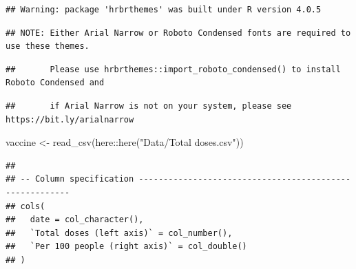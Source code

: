 \documentclass[11pt,a4paper,]{article}
\newenvironment{Shaded}{\begin{snugshade}}{\end{snugshade}}
\newcommand{\FunctionTok}[1]{\textcolor[rgb]{0.00,0.00,0.00}{#1}}
\newcommand{\NormalTok}[1]{#1}
\newcommand{\OtherTok}[1]{\textcolor[rgb]{0.56,0.35,0.01}{#1}}
\newcommand{\SpecialCharTok}[1]{\textcolor[rgb]{0.00,0.00,0.00}{#1}}
\newcommand{\StringTok}[1]{\textcolor[rgb]{0.31,0.60,0.02}{#1}}
\begin{document}
\begin{verbatim}
## Warning: package 'hrbrthemes' was built under R version 4.0.5
\end{verbatim}

\begin{verbatim}
## NOTE: Either Arial Narrow or Roboto Condensed fonts are required to use these themes.
\end{verbatim}

\begin{verbatim}
##       Please use hrbrthemes::import_roboto_condensed() to install Roboto Condensed and
\end{verbatim}

\begin{verbatim}
##       if Arial Narrow is not on your system, please see https://bit.ly/arialnarrow
\end{verbatim}

\begin{Shaded}
\begin{Highlighting}[]
\NormalTok{vaccine }\OtherTok{\textless{}{-}} \FunctionTok{read\_csv}\NormalTok{(here}\SpecialCharTok{::}\FunctionTok{here}\NormalTok{(}\StringTok{"Data/Total doses.csv"}\NormalTok{))}
\end{Highlighting}
\end{Shaded}

\begin{verbatim}
## 
## -- Column specification --------------------------------------------------------
## cols(
##   date = col_character(),
##   `Total doses (left axis)` = col_number(),
##   `Per 100 people (right axis)` = col_double()
## )
\end{verbatim}
\end{document}
